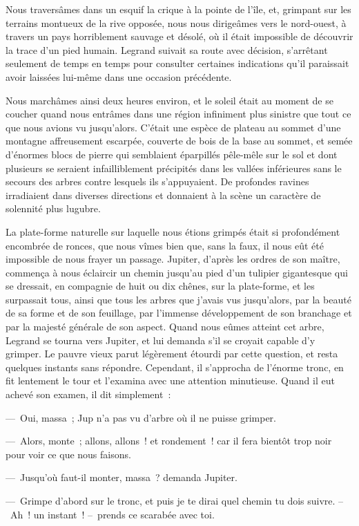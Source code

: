 \documentclass[french,twoside]{book} %
\begin{document}
Nous traversâmes dans un esquif la crique à la pointe de l’île, et, grimpant sur les terrains montueux de la rive opposée, nous nous dirigeâmes vers le nord-ouest, à travers un pays horriblement sauvage et désolé, où il était impossible de découvrir la trace d’un pied humain. Legrand suivait sa route avec décision, s’arrêtant seulement de temps en temps pour consulter certaines indications qu’il paraissait avoir laissées lui-même dans une occasion précédente.\par
Nous marchâmes ainsi deux heures environ, et le soleil était au moment de se coucher quand nous entrâmes dans une région infiniment plus sinistre que tout ce que nous avions vu jusqu’alors. C’était une espèce de plateau au sommet d’une montagne affreusement escarpée, couverte de bois de la base au sommet, et semée d’énormes blocs de pierre qui semblaient éparpillés pêle-mêle sur le sol et dont plusieurs se seraient infailliblement précipités dans les vallées inférieures sans le secours des arbres contre lesquels ils s’appuyaient. De profondes ravines irradiaient dans diverses directions et donnaient à la scène un caractère de solennité plus lugubre.\par
La plate-forme naturelle sur laquelle nous étions grimpés était si profondément encombrée de ronces, que nous vîmes bien que, sans la faux, il nous eût été impossible de nous frayer un passage. Jupiter, d’après les ordres de son maître, commença à nous éclaircir un chemin jusqu’au pied d’un tulipier gigantesque qui se dressait, en compagnie de huit ou dix chênes, sur la plate-forme, et les surpassait tous, ainsi que tous les arbres que j’avais vus jusqu’alors, par la beauté de sa forme et de son feuillage, par l’immense développement de son branchage et par la majesté générale de son aspect. Quand nous eûmes atteint cet arbre, Legrand se tourna vers Jupiter, et lui demanda s’il se croyait capable d’y grimper. Le pauvre vieux parut légèrement étourdi par cette question, et resta quelques instants sans répondre. Cependant, il s’approcha de l’énorme tronc, en fit lentement le tour et l’examina avec une attention minutieuse. Quand il eut achevé son examen, il dit simplement :\par
— Oui, massa ; Jup n’a pas vu d’arbre où il ne puisse grimper.\par
— Alors, monte ; allons, allons ! et rondement ! car il fera bientôt trop noir pour voir ce que nous faisons.\par
— Jusqu’où faut-il monter, massa ? demanda Jupiter.\par
— Grimpe d’abord sur le tronc, et puis je te dirai quel chemin tu dois suivre. – Ah ! un instant ! – prends ce scarabée avec toi.\par
\end{document}

